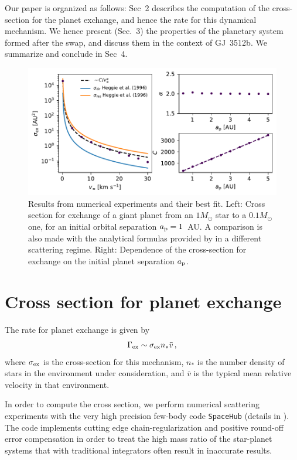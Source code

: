 \documentclass[twocolumn]{aastex62}
\begin{document}
Our paper is organized as follows: Sec~2 describes the computation of the cross-section for the planet exchange, 
and hence the rate for this dynamical mechanism. We hence present (Sec.~3) the 
properties of the planetary system formed after the swap, and discuss them in the context of GJ~3512b. We summarize and conclude in Sec~4.

\begin{figure}
 \includegraphics[width=1\columnwidth]{letter-fitting}
  \caption{Results from numerical experiments and their best fit. Left: Cross section for exchange of a giant planet from an $1M_\odot$ star to a $0.1M_\odot$ one, for an initial orbital separation $a_{\rm p}=1$~AU. {\color{red} A comparison is also made with the analytical formulas provided by \citet{Heggie96} in a different scattering regime.} 
  Right: Dependence of the cross-section for exchange on the initial planet separation $a_{\rm p}$. } 
 \label{fig:fitting}
\end{figure}

\section{Cross section for planet exchange}

The rate for planet exchange is given by
\begin{equation}
\Gamma_{\rm ex} \sim \sigma_{\rm ex} n_* \bar{v}\,,
\end{equation}
where $\sigma_{\rm ex}$ is the cross-section for this mechanism, $n_*$ is the number density of stars in the environment under consideration, and $\bar{v}$ is the typical mean relative velocity in that environment.

In order to compute the cross section, we perform 
numerical scattering experiments with the very high precision few-body code {\tt SpaceHub} (details in \citealt{Wang2018,Wang2019}). The code implements cutting edge chain-regularization \citep{Mikkola1993} and positive round-off error compensation in order to treat the high mass ratio of the star-planet systems that with traditional integrators often result in inaccurate results.
\end{document}
